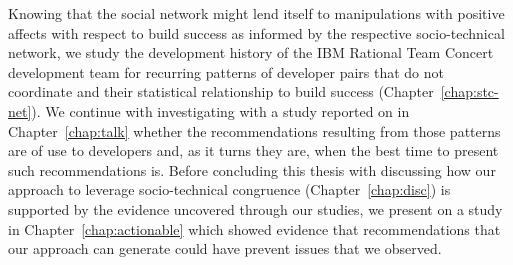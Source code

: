 Knowing that the social network might lend itself to manipulations with positive affects with respect to build success as informed by the respective socio-technical network, we study the development history of the IBM Rational Team Concert development team for recurring patterns of developer pairs that do not coordinate and their statistical relationship to build success (Chapter~\ref{chap:stc-net}).
We continue with investigating with a study reported on in Chapter~\ref{chap:talk} whether the recommendations resulting from those patterns are of use to developers and, as it turns they are, when the best time to present such recommendations is.
Before concluding this thesis with discussing how our approach to leverage socio-technical congruence (Chapter~\ref{chap:disc}) is supported by the evidence uncovered through our studies, we present on a study in Chapter~\ref{chap:actionable} which showed evidence that 
recommendations that our approach can generate could have prevent issues that we observed.






















